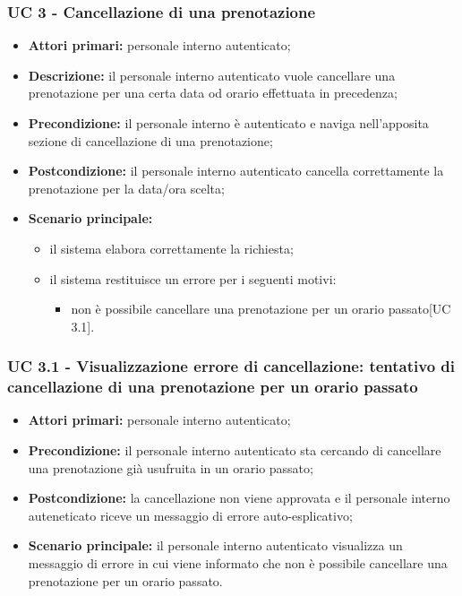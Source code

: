\subsubsection{UC 3 - Cancellazione di una prenotazione}

\begin{itemize}
\item \textbf{Attori primari:} personale interno autenticato;
\item \textbf{Descrizione:} il personale interno autenticato vuole cancellare una prenotazione per una certa data od orario effettuata in precedenza;
\item \textbf{Precondizione:} il personale interno è autenticato e naviga nell’apposita sezione di cancellazione di una prenotazione;
\item \textbf{Postcondizione:} il personale interno autenticato cancella correttamente la prenotazione per la data/ora scelta;
\item \textbf{Scenario principale:} 
	\begin{itemize}
		\item il sistema elabora correttamente la richiesta;
		\item il sistema restituisce un errore per i seguenti motivi:
		\begin{itemize}
			\item non è possibile cancellare una prenotazione per un orario passato[UC 3.1].
		\end{itemize}
	\end{itemize}
\end{itemize}

\subsubsection{UC 3.1 - Visualizzazione errore di cancellazione: tentativo di cancellazione di una prenotazione per un orario passato}
\begin{itemize}
\item \textbf{Attori primari:} personale interno autenticato;
\item \textbf{Precondizione:} il personale interno autenticato sta cercando di cancellare una prenotazione già usufruita in un orario passato;
\item \textbf{Postcondizione:} la cancellazione non viene approvata e il personale interno auteneticato riceve un messaggio di errore auto-esplicativo;
\item \textbf{Scenario principale:} il personale interno autenticato visualizza un messaggio di errore in cui viene informato che non è possibile cancellare una prenotazione per un orario passato.
\end{itemize}

